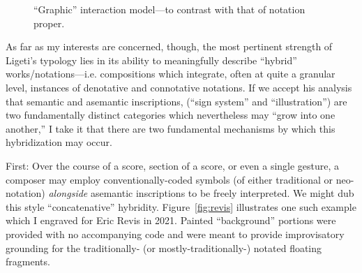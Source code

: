         \begin{figure} 
            \centering
            \captionsetup{width=.5\textwidth}
            \caption{``Graphic'' interaction model---to contrast with that of notation proper.}
            \label{fig:graphicdiagram}
        \end{figure}

    As far as my interests are concerned, though, the most pertinent strength of Ligeti's typology lies in its ability to meaningfully describe ``hybrid'' works/notations---i.e. compositions which integrate, often at quite a granular level, instances of denotative and connotative notations. If we accept his analysis that semantic and asemantic inscriptions, (``sign system'' and ``illustration'') are two fundamentally distinct categories which nevertheless may ``grow into one another,'' I take it that there are two fundamental mechanisms by which this hybridization may occur.\autocite[pg. 177 in Ernst et al., 1965]{Ligeti_forthcoming}
 
    First: Over the course of a score, section of a score, or even a single gesture, a composer may employ conventionally-coded symbols (of either traditional or neo-notation) \textit{alongside} asemantic inscriptions to be freely interpreted. We might dub this style ``concatenative'' hybridity. Figure~\ref{fig:revis} illustrates one such example which I engraved for Eric Revis in 2021. Painted ``background'' portions were provided with no accompanying code and were meant to provide improvisatory grounding for the traditionally- (or mostly-traditionally-) notated floating fragments.

